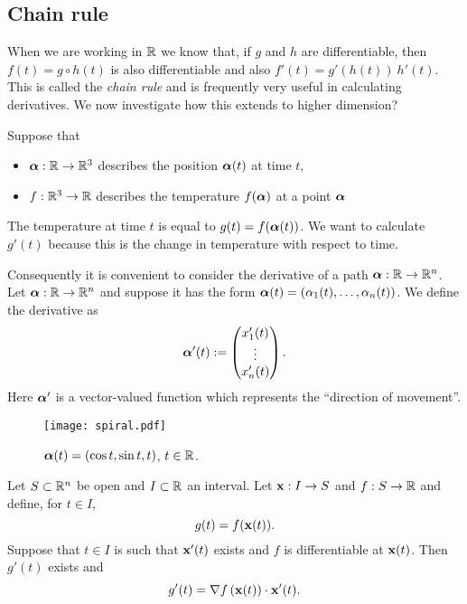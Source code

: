 \subsection*{Chain rule}

When we are working in \(\mathbb{R}\) we know that, if \(g\) and \(h\) are differentiable, then \(f(t) = g\circ h(t)\) is also differentiable and also \(f'(t) = g'(h(t)) \ h'(t)\).
This is called the \emph{chain rule} and is frequently very useful in calculating derivatives.
We now investigate how this extends to higher dimension?

\begin{example*}
    Suppose that
    \begin{itemize}
        \item \(\boldsymbol{\alpha}:\mathbb{R} \to \mathbb{R}^3\) describes the position \(\boldsymbol{\alpha}(t)\) at time \(t\),
        \item \(f:\mathbb{R}^3 \to \mathbb{R}\) describes the temperature \(f(\boldsymbol{\alpha})\) at a point \(\boldsymbol{\alpha}\)
    \end{itemize}
    The temperature at time \(t\) is equal to \(g(t)=f(\boldsymbol{\alpha}(t))\).
    We want to calculate \(g'(t)\) because this is the change in temperature with respect to time.
\end{example*}

Consequently it is convenient to consider the derivative of a path \(\boldsymbol{\alpha}:\mathbb{R} \to \mathbb{R}^n\).
Let \(\boldsymbol{\alpha}:\mathbb{R} \to \mathbb{R}^n\) and suppose it has the form
\(\boldsymbol{\alpha}(t) = \left( \alpha_1(t), \ldots, \alpha_n(t)  \right)\).
We define the derivative as
\[
    \boldsymbol{\alpha}'(t) := \begin{pmatrix}
        x_1'(t) \\
        \vdots  \\
        x_n'(t)
    \end{pmatrix}.
\]
\noindent
Here \(\boldsymbol{\alpha}'\) is a vector-valued function which represents the ``direction of movement''.

\begin{figure}[htb]
    \begin{center}
        \texttt{[image: spiral.pdf]}
        \caption{\(\boldsymbol{\alpha}(t)=(\cos t, \sin t, t)\), \(t\in \mathbb{R}\).}
        \label{fig:spiral}
    \end{center}
\end{figure}


\begin{theorem*}
    Let \(S\subset \mathbb{R}^n\) be open and \(I\subset \mathbb{R}\) an interval.
    Let \(\mathbf{x}: I \to S\) and \(f:S \to \mathbb{R}\) and define, for \(t\in I\),
    \[
        g(t) = f (\mathbf{x}(t)).
    \]
    Suppose that  \(t\in I\) is such that \(\mathbf{x}'(t)\) exists and \(f\) is differentiable at \(\mathbf{x}(t)\).
    Then \(g'(t)\) exists and
    \[
        g'(t) = \nabla f \left(\mathbf{x}(t)\right) \cdot \mathbf{x}'(t).
    \]
\end{theorem*}


